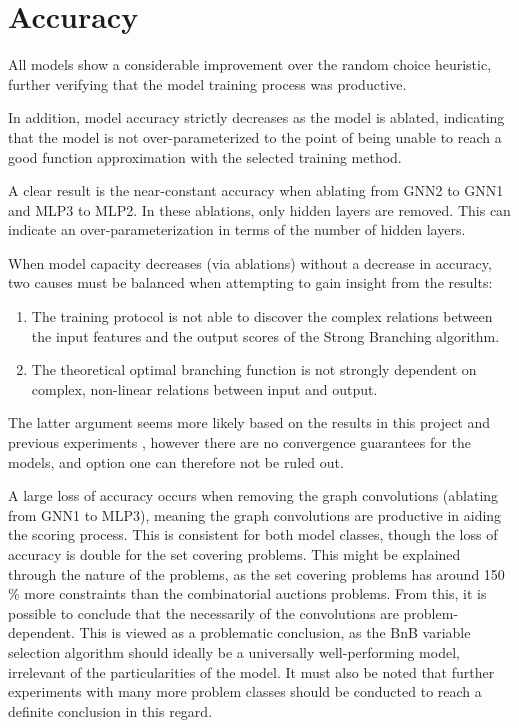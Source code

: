 \section{Accuracy}\label{sec:disc_accuracy}

All models show a considerable improvement over the random choice heuristic, further verifying that the model training process was productive. 

In addition, model accuracy strictly decreases as the model is ablated, indicating that the model is not over-parameterized to the point of being unable to reach a good function approximation with the selected training method. 

A clear result is the near-constant accuracy when ablating from GNN2 to GNN1 and MLP3 to MLP2. In these ablations, only hidden layers are removed. This can indicate an over-parameterization in terms of the number of hidden layers.


When model capacity decreases (via ablations) without a decrease in accuracy, two causes must be balanced when attempting to gain insight from the results: 
\begin{enumerate}[label=(\roman*)]
    \item The training protocol is not able to discover the complex relations between the input features and the output scores of the Strong Branching algorithm.
    \item The theoretical optimal branching function is not strongly dependent on complex, non-linear relations between input and output.
\end{enumerate}
The latter argument seems more likely based on the results in this project and previous experiments \cite{gupta2020hybrid} \cite{gasse2019exact}, however there are no convergence guarantees for the models, and option one can therefore not be ruled out.





A large loss of accuracy occurs when removing the graph convolutions (ablating from GNN1 to MLP3), meaning the graph convolutions are productive in aiding the scoring process. This is consistent for both model classes, though the loss of accuracy is double for the set covering problems. This might be explained through the nature of the problems, as the set covering problems has around 150 \% more constraints than the combinatorial auctions problems. From this, it is possible to conclude that the necessarily of the convolutions are problem-dependent. This is viewed as a problematic conclusion, as the \gls{BnB} variable selection algorithm should ideally be a universally well-performing model, irrelevant of the particularities of the model. It must also be noted that further experiments with many more problem classes should be conducted to reach a definite conclusion in this regard. 


